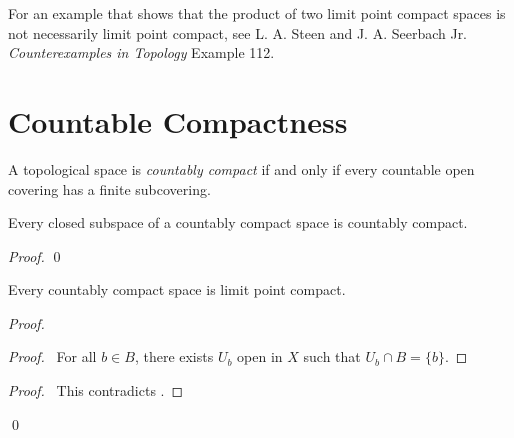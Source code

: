 For an example that shows that the product of two limit point compact spaces is not necessarily
limit point compact, see L. A. Steen and J. A. Seerbach Jr. \emph{Counterexamples in
Topology} Example 112.

\section{Countable Compactness}

\begin{definition}
    A topological space is \emph{countably compact} if and only if every
    countable open covering has a finite subcovering.
\end{definition}

\begin{proposition}[AC]
    Every closed subspace of a countably compact space is countably compact.
\end{proposition}

\begin{proof}
    \pf
    \qed
\end{proof}

\begin{proposition}[AC]
    Every countably compact space is limit point compact.
\end{proposition}

\begin{proof}
    \pf
    \begin{proof}
        \pf\ For all $b \in B$, there exists $U_b$ open in $X$ such that $U_b \cap B = \{ b \}$.
    \end{proof}
    \qedstep
    \begin{proof}
        \pf\ This contradicts .
    \end{proof}
    \qed
\end{proof}

